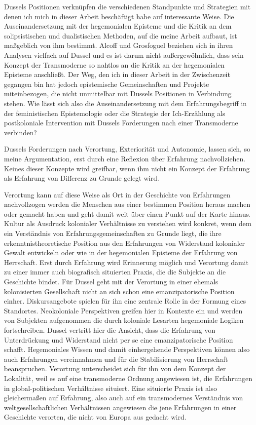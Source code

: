 Dussels Positionen verknüpfen die verschiedenen Standpunkte und Strategien mit
denen ich mich in dieser Arbeit beschäftigt habe auf interessante Weise. Die
Auseinandersetzung mit der hegemonialen Episteme und die Kritik an dem
solipsistischen und dualistischen Methoden, auf die meine Arbeit aufbaut, ist
maßgeblich von ihm bestimmt. Alcoff und Grosfoguel beziehen sich in ihren
Analysen vielfach auf Dussel und es ist darum nicht außergewöhnlich, dass sein
Konzept der Transmoderne so nahtlos an die Kritik an der hegemonialen Episteme
anschließt. Der Weg, den ich in dieser Arbeit in der Zwischenzeit gegangen bin
hat jedoch epistemische Gemeinschaften und Projekte miteinbezogen, die nicht
unmittelbar mit Dussels Positionen in Verbindung stehen. Wie lässt sich also die
Auseinandersetzung mit dem Erfahrungsbegriff in der feministischen Epistemologie
oder die Strategie der Ich-Erzählung als postkoloniale Intervention mit Dussels
Forderungen nach einer Transmoderne verbinden?

Dussels Forderungen nach Verortung, Exteriorität und Autonomie, lassen sich, so
meine Argumentation, erst durch eine Reflexion über Erfahrung nachvollziehen.
Keines dieser Konzepte wird greifbar, wenn ihm nicht ein Konzept der Erfahrung
als Erfahrung von Differenz zu Grunde gelegt wird.

Verortung kann auf diese Weise als Ort in der Geschichte von Erfahrungen
nachvollzogen werden die Menschen aus einer bestimmen Position heraus machen
oder gemacht haben und geht damit weit über einen Punkt auf der Karte hinaus.
Kultur als Ausdruck kolonialer Verhältnisse zu verstehen wird konkret, wenn dem
ein Verständnis von Erfahrungsgemeinschaften zu Grunde liegt, die ihre
erkenntnistheoretische Position aus den Erfahrungen von Widerstand kolonialer
Gewalt entwickeln oder wie in der hegemonialen Episteme der Erfahrung von
Herrschaft. Erst durch Erfahrung wird Erinnerung möglich und Verortung damit zu
einer immer auch biografisch situierten Praxis, die die Subjekte an die
Geschichte bindet. Für Dussel geht mit der Verortung in einer ehemals
kolonisierten Gesellschaft nicht an sich schon eine emanzipatorische Position
einher. Diskursangebote spielen für ihn eine zentrale Rolle in der Formung eines
Standortes. Neokoloniale Perspektiven greifen hier in Kontexte ein und werden
von Subjekten aufgenommen die durch koloniale Lesarten hegemoniale Logiken
fortschreiben. Dussel vertritt hier die Ansicht, dass die Erfahrung von
Unterdrückung und Widerstand nicht per se eine emanzipatorische Position
schafft. Hegemoniales Wissen und damit einhergehende Perspektiven können also
auch Erfahrungen vereinnahmen und für die Stabilisierung von Herrschaft
beanspruchen. Verortung unterscheidet sich für ihn von dem Konzept der
Lokalität, weil es auf eine transmoderne Ordnung angewiesen ist, die Erfahrungen
in global-politischen Verhältnisse situiert. Eine situierte Praxis ist also
gleichermaßen auf Erfahrung, also auch auf ein transmodernes Verständnis von
weltgesellschaftlichen Verhältnissen angewiesen die jene Erfahrungen in einer
Geschichte verorten, die nicht von Europa aus gedacht wird.

